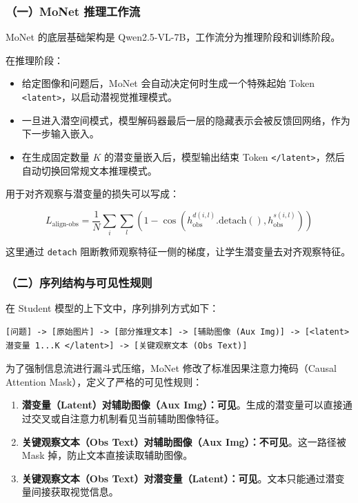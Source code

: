 \hypertarget{ux4e00monet-ux63a8ux7406ux5de5ux4f5cux6d41}{%
\subsubsection{（一）MoNet 推理工作流}\label{ux4e00monet-ux63a8ux7406ux5de5ux4f5cux6d41}}

MoNet 的底层基础架构是 Qwen2.5-VL-7B，工作流分为推理阶段和训练阶段。

在推理阶段：

\begin{itemize}
\tightlist
\item
  给定图像和问题后，MoNet 会自动决定何时生成一个特殊起始 Token \texttt{\textless{}latent\textgreater{}}，以启动潜视觉推理模式。
\item
  一旦进入潜空间模式，模型解码器最后一层的隐藏表示会被反馈回网络，作为下一步输入嵌入。
\item
  在生成固定数量 \(K\) 的潜变量嵌入后，模型输出结束 Token \texttt{\textless{}/latent\textgreater{}}，然后自动切换回常规文本推理模式。
\end{itemize}

用于对齐观察与潜变量的损失可以写成：

\[
L_{\text{align-obs}}
=\frac{1}{N}\sum_i\sum_l
\left(
1-\cos\left(h_{\text{obs}}^{d(i,l)}.\mathrm{detach}(),h_{\text{obs}}^{s(i,l)}\right)
\right)
\]

这里通过 \texttt{detach} 阻断教师观察特征一侧的梯度，让学生潜变量去对齐观察特征。

\hypertarget{ux4e8cux5e8fux5217ux7ed3ux6784ux4e0eux53efux89c1ux6027ux89c4ux5219}{%
\subsubsection{（二）序列结构与可见性规则}\label{ux4e8cux5e8fux5217ux7ed3ux6784ux4e0eux53efux89c1ux6027ux89c4ux5219}}

在 Student 模型的上下文中，序列排列方式如下：

\begin{verbatim}
[问题] -> [原始图片] -> [部分推理文本] -> [辅助图像 (Aux Img)] -> [<latent> 潜变量 1...K </latent>] -> [关键观察文本 (Obs Text)]
\end{verbatim}

为了强制信息流进行漏斗式压缩，MoNet 修改了标准因果注意力掩码（Causal Attention Mask），定义了严格的可见性规则：

\begin{enumerate}
\def\labelenumi{\arabic{enumi}.}
\tightlist
\item
  \textbf{潜变量（Latent）对辅助图像（Aux Img）：可见}。生成的潜变量可以直接通过交叉或自注意力机制看见当前辅助图像特征。
\item
  \textbf{关键观察文本（Obs Text）对辅助图像（Aux Img）：不可见}。这一路径被 Mask 掉，防止文本直接读取辅助图像。
\item
  \textbf{关键观察文本（Obs Text）对潜变量（Latent）：可见}。文本只能通过潜变量间接获取视觉信息。
\end{enumerate}

